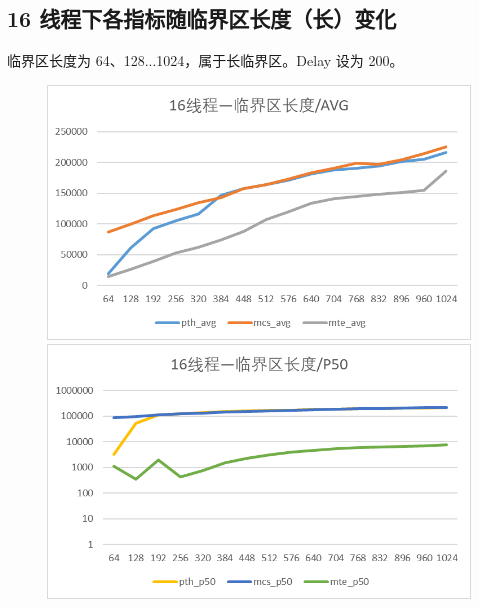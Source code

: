 \documentclass[UTF8]{ctexart}
\begin{document}
\subsection{16 线程下各指标随临界区长度（长）变化}

临界区长度为 64、128...1024，属于长临界区。Delay 设为 200。

\begin{figure}[!h]
    \centering
    \begin{minipage}{0.49\linewidth}
        \centering
        \includegraphics[scale=0.64]{../images/15.png}
    \end{minipage}
    \begin{minipage}{0.49\linewidth}
        \centering
        \includegraphics[scale=0.64]{../images/16.png}
    \end{minipage}
\end{figure}
\end{document}
